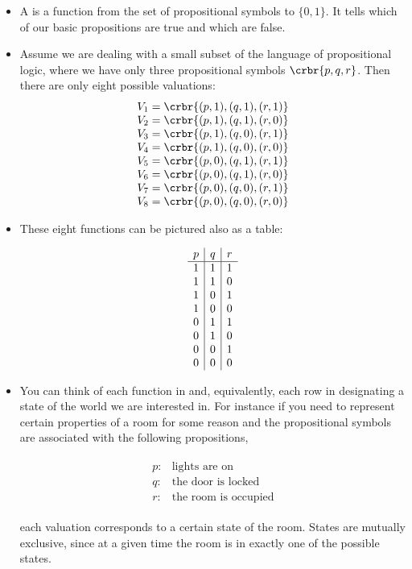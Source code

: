 \documentclass[11pt]{article}
\begin{document}
\begin{itemize}

\item A  is a function from the set of propositional symbols to
$\{ 0,1\}$. It tells which of our basic propositions are true and which are
false.

\item Assume we are dealing with a small subset of the language of propositional
logic, where we have only three propositional symbols $\crbr{p,q,r}$. Then there
are only eight possible valuations:
\begin{align}\label{valfunc}
\begin{array}[t]{c}
V_1 = \crbr{(p,1),(q,1),(r,1)} \\
V_2 = \crbr{(p,1),(q,1),(r,0)} \\
V_3 = \crbr{(p,1),(q,0),(r,1)} \\
V_4 = \crbr{(p,1),(q,0),(r,0)} \\
V_5 = \crbr{(p,0),(q,1),(r,1)} \\
V_6 = \crbr{(p,0),(q,1),(r,0)} \\
V_7 = \crbr{(p,0),(q,0),(r,1)} \\
V_8 = \crbr{(p,0),(q,0),(r,0)} 
\end{array}
\end{align}

\item These eight functions can be pictured also as a table:

\begin{align}\label{valtab}
\begin{array}[t]{c|c|c}
p & q & r \\
\hline 
1 & 1 &1 \\
1 & 1 & 0\\
1 & 0 &1 \\
1 &  0& 0\\
0 & 1 &1 \\
0 & 1 & 0\\
0 &  0& 1\\
0 &  0& 0
\end{array}
\end{align}

\item You can think of each function in  and, equivalently, each row
in  designating a state of the world we are interested in. For
instance if you need to represent certain properties of a room for some reason and the
propositional symbols are associated with the following propositions,

\begin{align}
\begin{array}{ll}
p: & \text{lights are on}\\
q: & \text{the door is locked}\\
r: &\text{the room is occupied}
\end{array}
\end{align}


each valuation corresponds to a certain state of the room. States are
mutually exclusive, since at a given time the room is in exactly one of the possible states.

\end{itemize}
\end{document}
